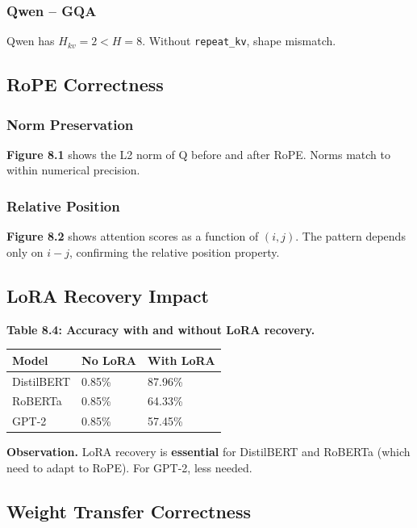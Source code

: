 \subsubsection{Qwen -- GQA}

Qwen has $H_{kv} = 2 < H = 8$. Without \texttt{repeat\_kv}, shape mismatch.

\subsection{RoPE Correctness}

\subsubsection{Norm Preservation}

\textbf{Figure 8.1} shows the L2 norm of Q before and after RoPE. Norms 
match to within numerical precision.

\subsubsection{Relative Position}

\textbf{Figure 8.2} shows attention scores as a function of $(i, j)$. The 
pattern depends only on $i - j$, confirming the relative position 
property.

\subsection{LoRA Recovery Impact}

\textbf{Table 8.4: Accuracy with and without LoRA recovery.}

\begin{table}[H]
\centering
\small
\begin{tabular}{lll}
\toprule
\textbf{Model} & \textbf{No LoRA} & \textbf{With LoRA} \\
\midrule
DistilBERT & 0.85\% & 87.96\% \\
RoBERTa & 0.85\% & 64.33\% \\
GPT-2 & 0.85\% & 57.45\% \\
\bottomrule
\end{tabular}
\end{table}

\textbf{Observation.} LoRA recovery is \textbf{essential} for DistilBERT and 
RoBERTa (which need to adapt to RoPE). For GPT-2, less needed.

\subsection{Weight Transfer Correctness}

